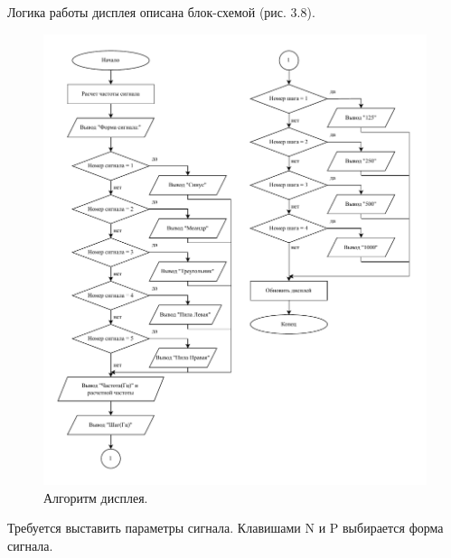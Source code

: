 	Логика работы дисплея описана блок-схемой (рис. 3.8).
	
	\begin{figure}[H]
    \centering
    \includegraphics[width=1\textwidth]{../image/display.pdf}
    \caption{Алгоритм дисплея.}
	\end{figure}	
	
	Требуется выставить параметры сигнала. Клавишами N и P выбирается форма сигнала.
	
